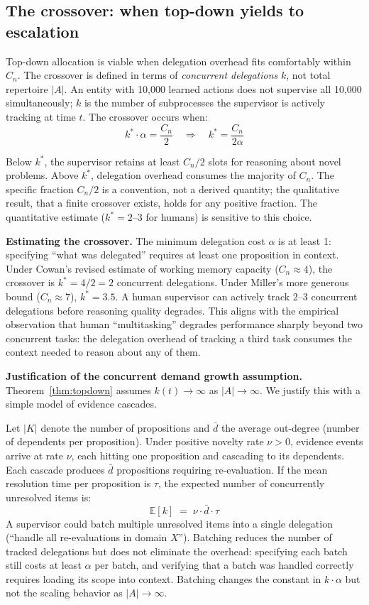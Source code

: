 \documentclass[11pt]{article}
\theoremstyle{definition}
\begin{document}
\subsection{The crossover: when top-down yields to escalation}
\label{sec:crossover}

Top-down allocation is viable when delegation overhead fits comfortably
within $C_n$. The crossover is defined in terms of \emph{concurrent
delegations} $k$, not total repertoire $|A|$. An entity with
10{,}000 learned actions does not supervise all 10{,}000
simultaneously; $k$ is the number of subprocesses the supervisor is
actively tracking at time $t$. The crossover occurs when:
\[
k^* \cdot \alpha = \frac{C_n}{2}
\quad\Longrightarrow\quad
k^* = \frac{C_n}{2\alpha}
\]

Below $k^*$, the supervisor retains at least $C_n/2$ slots for
reasoning about novel problems. Above $k^*$, delegation overhead
consumes the majority of $C_n$. The specific fraction $C_n/2$ is a
convention, not a derived quantity; the qualitative result, that a finite
crossover exists, holds for any positive fraction. The quantitative
estimate ($k^* = 2$--$3$ for humans) is sensitive to this choice.

\textbf{Estimating the crossover.} The minimum delegation cost $\alpha$
is at least 1: specifying ``what was delegated'' requires at least one
proposition in context. Under Cowan's \cite{Cowan2001} revised estimate
of working memory capacity ($C_n \approx 4$), the crossover is
$k^* = 4/2 = 2$ concurrent delegations. Under Miller's more generous
bound ($C_n \approx 7$), $k^* = 3.5$. A human supervisor can
actively track 2--3 concurrent delegations before reasoning quality
degrades. This aligns with the empirical observation that human
``multitasking'' degrades performance sharply beyond two concurrent
tasks: the delegation overhead of tracking a third task consumes the
context needed to reason about any of them.

\textbf{Justification of the concurrent demand growth assumption.}
Theorem~\ref{thm:topdown} assumes $k(t) \to \infty$ as
$|A| \to \infty$. We justify this with a simple model of evidence
cascades.

Let $|K|$ denote the number of propositions and $\bar{d}$ the average
out-degree (number of dependents per proposition). Under positive
novelty rate $\nu > 0$, evidence events arrive at rate $\nu$, each
hitting one proposition and cascading to its dependents. Each cascade
produces $\bar{d}$ propositions requiring re-evaluation. If the mean
resolution time per proposition is $\tau$, the expected number of
concurrently unresolved items is:
\[
\mathbb{E}[k] \;=\; \nu \cdot \bar{d} \cdot \tau
\]
A supervisor could batch multiple unresolved items into a single
delegation (``handle all re-evaluations in domain $X$''). Batching
reduces the number of tracked delegations but does not eliminate the
overhead: specifying each batch still costs at least $\alpha$ per
batch, and verifying that a batch was handled correctly requires
loading its scope into context. Batching changes the constant in
$k \cdot \alpha$ but not the scaling behavior as $|A| \to \infty$.
\end{document}
